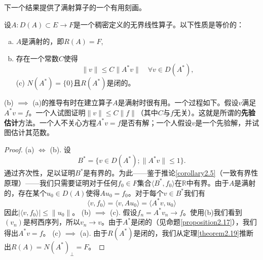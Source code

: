 下一个结果提供了满射算子的一个有用刻画。
\begin{theorem}\label{theorem2.20_again}
设$A:D(A) \subset E \to F$是一个稠密定义的无界线性算子。以下性质是等价的：
\begin{enumerate}[(a)]
    \item $A$是满射的，即$R(A)=F$,
    \item 存在一个常数$C$使得
    \[ \|v\| \leq C\|A^*v\| \quad \forall v \in D(A^*), \]
    (c) $N(A^*) = \{0\}$且$R(A^*)$是闭的。
\end{enumerate}
\end{theorem}
\begin{remark}
(b) $\implies$ (a)的推导有时在建立算子$A$是满射时很有用。一个过程如下。假设$v$满足$A^*v=f$。一个人试图证明$\|v\| \leq C\|f\|$（其中$C$与$f$无关）。这就是所谓的\textbf{先验估计}方法。一个人不关心方程$A^*v=f$是否有解；一个人假设$v$是一个先验解，并试图估计其范数。
\end{remark}
\begin{proof}
(a) $\iff$ (b). 设
\[ B^* = \{v \in D(A^*); \|A^*v\| \leq 1\}. \]
通过齐次性，足以证明$B^*$是有界的。为此——鉴于推论\ref{corollary2.5}（一致有界性原理）——我们只需要证明对于任何$f_0 \in F$集合$\langle B^*, f_0 \rangle$在$\mathbb{R}$中有界。由于$A$是满射的，存在某个$u_0 \in D(A)$使得$Au_0=f_0$。对于每个$v \in B^*$我们有
\[ \langle v, f_0 \rangle = \langle v, Au_0 \rangle = \langle A^*v, u_0 \rangle \]
因此$|\langle v, f_0 \rangle| \leq \|u_0\|$。
(b) $\implies$ (c). 假设$f_n = A^*v_n \to f$。使用(b)我们看到$(v_n)$是柯西序列，所以$v_n \to v$。由于$A^*$是闭的（见命题\ref{proposition2.17}），我们得出$A^*v=f$。
(c) $\implies$ (a). 由于$R(A^*)$是闭的，我们从定理\ref{theorem2.19}推断出$R(A)=N(A^*)_\perp = F$。
\end{proof}

